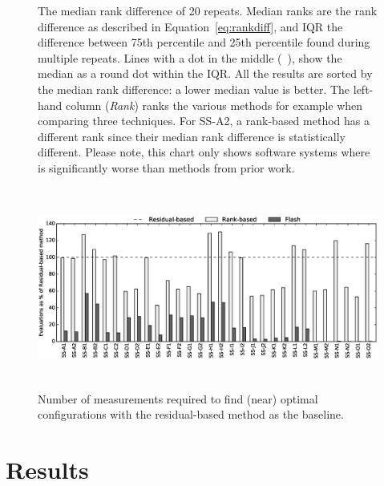 \begin{figure}[tbh]
{}
    
    \caption{
        {\small 
            The median rank difference of 20 repeats. Median ranks are the rank difference as described in Equation~\ref{eq:rankdiff}, and IQR the difference between 75th percentile and 25th percentile found during multiple repeats. 
            Lines with a dot in the middle 
            (~\protect{}), 
            show the median as a round dot within the IQR.
            All the results are sorted by the median rank difference: a lower median value is better. 
            The left-hand column (\textit{Rank}) ranks the various methods for example when comparing three techniques. For SS-A2, a rank-based method has a different rank since their median rank difference is statistically different. Please note, this chart only shows software systems where \flash is significantly worse than methods from prior work.
        }
    }
    \label{fig:stat-test}
\end{figure}

\begin{figure}[t]
        \centering
        \includegraphics[width=0.7\paperwidth, height=6.6cm]{Figures/one_obj_evals.eps}

        \caption{
        \small{
        Number of measurements required to find (near) optimal configurations with the residual-based method as the baseline.\vspace{5mm}}
        }\label{fig:evals}
\end{figure}

\section{Results}
